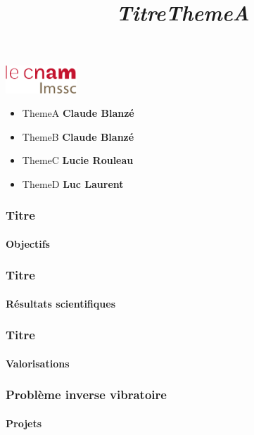 \documentclass[xcolor=table,10pt]{beamer}
\title[Titre]{\textit{Titre}}
\author[HCERES]{}
\date{}
\newcommand{\people}[1]
	  {\normalfont\textbf{\textcolor{ColorPeople}{\footnotesize #1}}}
\begin{document}
\begin{frame}[plain]
	\begin{flushright}
		\includegraphics[width=0.2\textwidth]{LOGO_LMSSC.pdf}
	\end{flushright}
	\vfill
	\titlepage
	\vfill
	\begin{block}{}
		\begin{itemize}
			\item ThemeA \people{Claude Blanz\'e}
			\item ThemeB \people{Claude Blanz\'e}
			\item ThemeC \people{Lucie Rouleau}
			\item ThemeD \people{Luc Laurent}
		\end{itemize}
	\end{block}
\end{frame}
%
%
\title[]{\textit{ThemeA}}
%
\begin{frame}[plain]
	\vfill
	\titlepage
	\vfill
\end{frame}

\begin{frame}
	\frametitle{Titre}
	\framesubtitle{Objectifs}

\end{frame}

\begin{frame}
	\frametitle{Titre}
	\framesubtitle{Résultats scientifiques}

\end{frame}

\begin{frame}
	\frametitle{Titre}
	\framesubtitle{Valorisations}

\end{frame}

\begin{frame}
	\frametitle{Problème inverse vibratoire}
	\framesubtitle{Projets}

\end{frame}
\end{document}
